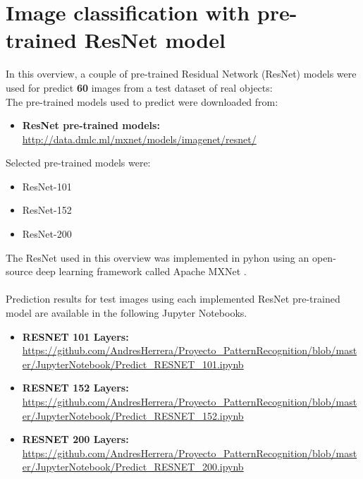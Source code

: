 \documentclass[12pt]{article}
\numberwithin{equation}{section}
\numberwithin{table}{section}
\numberwithin{figure}{section}
\begin{document}





\section{Image classification with pre-trained ResNet model} \label{approach}

In this overview, a couple of pre-trained Residual Network (ResNet) models were used for predict \textbf{60} images from a test dataset of real objects:\\
\newline
\noindent
The pre-trained models used to predict were downloaded from:

\begin{itemize}
	\item[] {\textbf{ResNet pre-trained models: } } \url{http://data.dmlc.ml/mxnet/models/imagenet/resnet/}
\end{itemize}

\noindent
Selected pre-trained models were:

\begin{itemize}
\item ResNet-101
\item ResNet-152
\item ResNet-200
\end{itemize}

\noindent
The ResNet used in this overview was implemented in pyhon using an open-source deep learning framework called Apache MXNet \cite{mxnet}.\\\\
\noindent
Prediction results for test images using each implemented ResNet pre-trained model are available in the following Jupyter Notebooks. 

\begin{itemize}
	\item {\textbf{RESNET 101 Layers:} } \url{https://github.com/AndresHerrera/Proyecto_PatternRecognition/blob/master/JupyterNotebook/Predict_RESNET_101.ipynb}
	
	\item {\textbf{RESNET 152 Layers:} } \url{https://github.com/AndresHerrera/Proyecto_PatternRecognition/blob/master/JupyterNotebook/Predict_RESNET_152.ipynb}
	
	\item {\textbf{RESNET 200 Layers:} } \url{https://github.com/AndresHerrera/Proyecto_PatternRecognition/blob/master/JupyterNotebook/Predict_RESNET_200.ipynb}	
\end{itemize}
\end{document}
